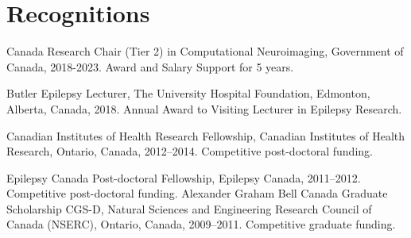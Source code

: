 
\section{Recognitions}

\begingroup
\renewcommand{\section}[2]{}%
\begin{thebibliography}{99}

\setcounter{enumi}{0}

 Canada Research Chair (Tier 2) in Computational Neuroimaging, Government of Canada, 2018-2023. Award and Salary Support for 5 years.

 Butler Epilepsy Lecturer, The University Hospital Foundation, Edmonton, Alberta, Canada, 2018. Annual Award to Visiting Lecturer in Epilepsy Research.

 Canadian Institutes of Health Research Fellowship, Canadian Institutes of Health Research, Ontario, Canada, 2012–2014.  Competitive post-doctoral funding.

 Epilepsy Canada Post-doctoral Fellowship, Epilepsy Canada, 2011–2012. Competitive post-doctoral funding.
 Alexander Graham Bell Canada Graduate Scholarship CGS-D, Natural Sciences and Engineering Research Council of Canada (NSERC), Ontario, Canada, 2009–2011. Competitive graduate funding.

\end{thebibliography}
\endgroup



